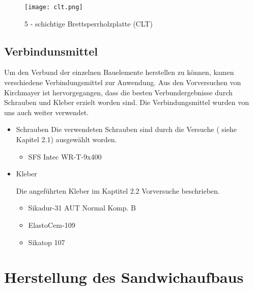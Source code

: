 \documentclass[12 pt,a4 paper ]{scrreprt}
\begin{document}
\begin{figure}[h]
\begin{center}
\texttt{[image: clt.png]}
\caption{5 - schichtige Brettsperrholzplatte (CLT)}
\label{clt}
\end{center}
\end{figure}

\subsection{Verbindunsmittel}

Um den Verbund der einzelnen Bauelemente herstellen zu können, kamen verschiedene Verbindungsmittel zur Anwendung. Aus den Vorversuchen von Kirchmayer ist hervorgegangen, dass die besten Verbundergebnisse durch Schrauben und Kleber  erzielt worden sind. Die Verbindungsmittel wurden von uns auch weiter verwendet.




\begin{itemize}
\item Schrauben
\newline
Die verwendeten Schrauben sind durch die Versuche ( siehe Kapitel 2.1) ausgewählt worden.
\newline
\begin{itemize}
\item SFS Intec WR-T-9x400
\end{itemize}

\item Kleber

Die angeführten Kleber im Kaptitel 2.2 Vorversuche beschrieben.
\newline

\begin{itemize}
\item Sikadur-31 AUT Normal Komp. B
\item ElastoCem-109 
\item Sikatop 107 
\end{itemize}

\end{itemize}

\section{Herstellung des Sandwichaufbaus}
\end{document}
